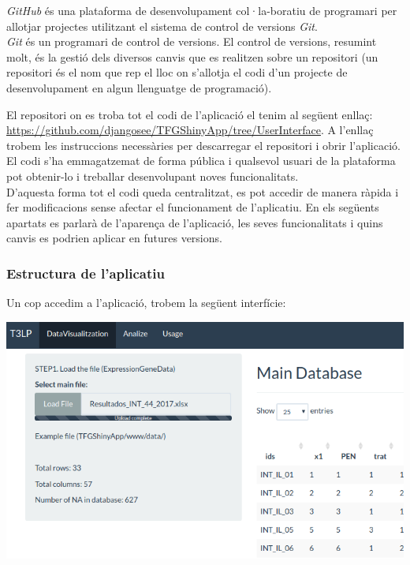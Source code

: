 \documentclass[english]{article}
\begin{document}
\textit{GitHub} és una plataforma de desenvolupament col·la-boratiu de programari per allotjar projectes utilitzant el sistema de control de versions \textit{Git}.
\\

\textit{Git} és un programari de control de versions. El control de versions, resumint molt, és la gestió dels diversos canvis que es realitzen sobre un repositori (un repositori és el nom que rep el lloc on s'allotja el codi d'un projecte de desenvolupament en algun llenguatge de programació).

\newpage
El repositori on es troba tot el codi de l'aplicació el tenim al següent enlla\c{c}: \url{https://github.com/djangosee/TFGShinyApp/tree/UserInterface}.
A l'enlla\c{c} trobem les instruccions necessàries per descarregar el repositori i obrir l'aplicació. El codi s'ha emmagatzemat de forma pública i qualsevol usuari de la plataforma pot obtenir-lo i treballar desenvolupant noves funcionalitats.
\\

D'aquesta forma tot el codi queda centralitzat, es pot accedir de manera ràpida i fer modificacions sense afectar el funcionament de l'aplicatiu. En els següents apartats es parlarà de l'aparen\c{c}a de l'aplicació, les seves funcionalitats i quins canvis es podrien aplicar en futures versions.
\subsubsection{Estructura de l'aplicatiu}
Un cop accedim a l'aplicació, trobem la següent interfície:
\begin{center}
\includegraphics[scale=0.3]{app1.png}
\end{center}
\end{document}
